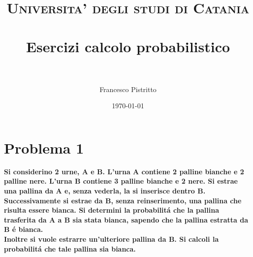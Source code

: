 \documentclass[paper=a4, fontsize=11pt]{scrartcl} %
\title{	
\normalfont \normalsize 
\textsc{Universita' degli studi di Catania} \\ [25pt] %
\horrule{0.5pt} \\[0.4cm] %
\huge Esercizi calcolo probabilistico \\ %
\horrule{2pt} \\[0.5cm] %
}
\author{Francesco Pistritto} %
\date{\normalsize\today} %
\numberwithin{equation}{section} %
\numberwithin{figure}{section} %
\numberwithin{table}{section} %
\begin{document}
\maketitle %


\section*{Problema 1}

\textbf{
Si considerino 2 urne, A e B. L'urna A contiene 2 palline bianche e 2 palline nere. L'urna B contiene 3 palline bianche e 2 nere. Si estrae una pallina da A e, senza vederla, la si inserisce dentro B. Successivamente si estrae da B, senza reinserimento, una pallina che risulta essere bianca. Si determini la probabilit\'a che la pallina trasferita da A a B sia stata bianca, sapendo che la pallina estratta da B \'e bianca.\\
Inoltre si vuole estrarre un'ulteriore pallina da B. Si calcoli la probabilit\'a che tale pallina sia bianca.
}

\end{document}
